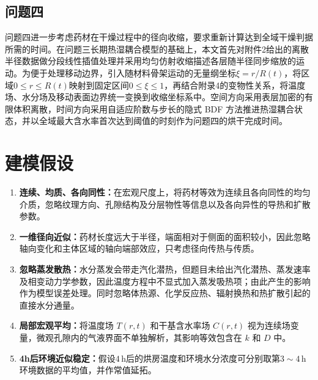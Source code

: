 \documentclass[withoutpreface,bwprint]{cumcmthesis}
\begin{document}
\subsection{问题四}

问题四进一步考虑药材在干燥过程中的径向收缩，要求重新计算达到全域干燥判据所需的时间。在问题三长期热湿耦合模型的基础上，本文首先对附件2给出的离散半径数据做分段线性插值处理并采用均匀仿射收缩描述各层随半径同步缩放的运动。为便于处理移动边界，引入随材料骨架运动的无量纲坐标$\xi=r/R(t)$，将区域$0\le r\le R(t)$映射到固定区间$0\le\xi\le1$，再结合附录4的变物性关系，将温度场、水分场及移动表面边界统一变换到收缩坐标系中。空间方向采用表层加密的有限体积离散，时间方向采用自适应阶数与步长的隐式 BDF 方法推进热湿耦合状态，并以全域最大含水率首次达到阈值的时刻作为问题四的烘干完成时间。


\section{建模假设}
\begin{enumerate}[label=\arabic*.,leftmargin=2em,itemsep=0pt,topsep=0pt]
  \item \textbf{连续、均质、各向同性：}在宏观尺度上，将药材等效为连续且各向同性的均匀介质，忽略纹理方向、孔隙结构及分层物性等信息以及各向异性的导热和扩散参数。
  \item \textbf{一维径向近似：}药材长度远大于半径，端面相对于侧面的面积较小，因此忽略轴向变化和主体区域的轴向端部效应，只考虑径向传热与传质。
  \item \textbf{忽略蒸发散热：}水分蒸发会带走汽化潜热，但题目未给出汽化潜热、蒸发速率及相变动力学参数，因此温度方程中不显式加入蒸发吸热项；由此产生的影响作为模型误差处理。同时忽略体热源、化学反应热、辐射换热和热扩散引起的直接水分通量。
  \item \textbf{局部宏观平均：}将温度场 $T(r,t)$ 和干基含水率场 $C(r,t)$ 视为连续场变量，微观孔隙内的气液界面不单独解析，其影响等效包含在 $k$ 和 $D$ 中。
  \item \textbf{4h后环境近似稳定：}假设$4\,\mathrm{h}$后的烘房温度和环境水分浓度可分别取第$3\sim4\,\mathrm{h}$环境数据的平均值，并作常值延拓。

\end{enumerate}
\end{document}
